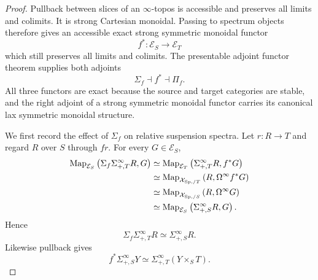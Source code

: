 \begin{proof}
Pullback between slices of an \(\infty\)-topos is accessible and preserves all limits and colimits.
It is strong Cartesian monoidal.  Passing to spectrum objects therefore gives an accessible exact
strong symmetric monoidal functor
\[
    f^*:\mathcal E_S\longrightarrow\mathcal E_T
\]
which still preserves all limits and colimits.  The presentable adjoint functor theorem supplies
both adjoints
\[
    \Sigma_f\dashv f^*\dashv \Pi_f.
\]
All three functors are exact because the source and target categories are stable, and the right
adjoint of a strong symmetric monoidal functor carries its canonical lax symmetric monoidal
structure.

We first record the effect of \(\Sigma_f\) on relative suspension spectra.  Let \(r:R\to T\) and
regard \(R\) over \(S\) through \(fr\).  For every \(G\in\mathcal E_S\),
\[
\begin{aligned}
    \operatorname{Map}_{\mathcal E_S}
    \left(
        \Sigma_f\Sigma^\infty_{+,T}R,G
    \right)
    &\simeq
    \operatorname{Map}_{\mathcal E_T}
    \left(
        \Sigma^\infty_{+,T}R,f^*G
    \right)
    \\
    &\simeq
    \operatorname{Map}_{\mathcal X_{\mathrm{Sp},/T}}
    \left(
        R,\Omega^\infty f^*G
    \right)
    \\
    &\simeq
    \operatorname{Map}_{\mathcal X_{\mathrm{Sp},/S}}
    \left(
        R,\Omega^\infty G
    \right)
    \\
    &\simeq
    \operatorname{Map}_{\mathcal E_S}
    \left(
        \Sigma^\infty_{+,S}R,G
    \right).
\end{aligned}
\]
Hence
\[
    \Sigma_f\Sigma^\infty_{+,T}R
    \simeq
    \Sigma^\infty_{+,S}R.
\]
Likewise pullback gives
\[
    f^*\Sigma^\infty_{+,S}Y
    \simeq
    \Sigma^\infty_{+,T}(Y\times_ST).
\]


\end{proof}
